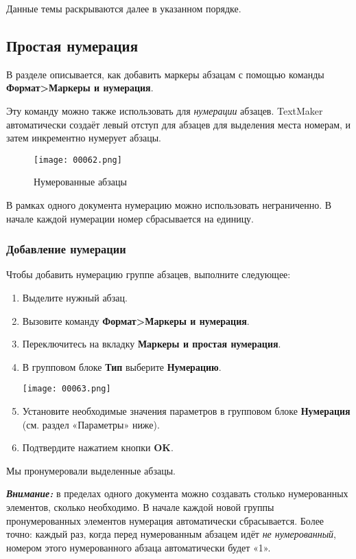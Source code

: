 ﻿\documentclass[a4paper,10pt]{article}
\begin{document}
Данные темы раскрываются далее в указанном порядке.

\subsection{Простая нумерация} \label{sec:простаянумерация}
В разделе  описывается, как добавить маркеры абзацам с помощью команды \textbf{Формат>Маркеры и нумерация}.

Эту команду можно также использовать для \textit{нумерации} абзацев. TextMaker автоматически создаёт левый отступ для абзацев для выделения места номерам, и затем инкрементно нумерует абзацы.

\begin{figure}[ht]
\texttt{[image: 00062.png]}
\centering
\caption{Нумерованные абзацы}
\end{figure}

В рамках одного документа нумерацию можно использовать неграниченно. В начале каждой нумерации номер сбрасывается на единицу.

\subsubsection{Добавление нумерации}
Чтобы добавить нумерацию группе абзацев, выполните следующее:

\begin{enumerate}
 \item Выделите нужный абзац.
 \item Вызовите команду \textbf{Формат>Маркеры и нумерация}.
 \item Переключитесь на вкладку \textbf{Маркеры и простая нумерация}.
 \item В групповом блоке \textbf{Тип} выберите \textbf{Нумерацию}.
 
 \texttt{[image: 00063.png]}
 
 \item Установите необходимые значения параметров в групповом блоке \textbf{Нумерация} (см. раздел «Параметры» ниже).
 \item Подтвердите нажатием кнопки \textbf{OK}. 
\end{enumerate}

Мы пронумеровали выделенные абзацы.

\textit{\textbf{Внимание:}} в пределах одного документа можно создавать столько нумерованных элементов, сколько необходимо. В начале каждой новой группы пронумерованных элементов нумерация автоматически сбрасывается. Более точно: каждый раз, когда перед нумерованным абзацем идёт \textit{не нумерованный}, номером этого нумерованного абзаца автоматически будет «1».
\end{document}
